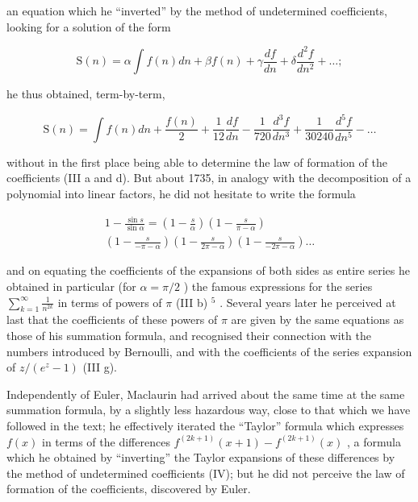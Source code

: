 an equation which he ``inverted'' by the method of undetermined coefficients, looking for a solution of the form

\[
\mathrm{S} (n) = \alpha \int f (n) d n + \beta f (n) + \gamma \frac {d f}{d n} + \delta \frac {d ^ {2} f}{d n ^ {2}} + \dots ;
\]

he thus obtained, term-by-term,

\[
\mathrm{S} (n) = \int f (n) d n + \frac {f (n)}{2} + \frac {1}{1 2} \frac {d f}{d n} - \frac {1}{7 2 0} \frac {d ^ {3} f}{d n ^ {3}} + \frac {1}{3 0 2 4 0} \frac {d ^ {5} f}{d n ^ {5}} - \dots
\]

without in the first place being able to determine the law of formation of the coefficients (III a and d). But about 1735, in analogy with the decomposition of a polynomial into linear factors, he did not hesitate to write the formula

\[
\begin{array}{c} 1 - \frac {\sin s}{\sin \alpha} = \left(1 - \frac {s}{\alpha}\right) \left(1 - \frac {s}{\pi - \alpha}\right) \\ \left(1 - \frac {s}{- \pi - \alpha}\right) \left(1 - \frac {s}{2 \pi - \alpha}\right) \left(1 - \frac {s}{- 2 \pi - \alpha}\right) \dots \end{array}
\]

and on equating the coefficients of the expansions of both sides as entire series he obtained in particular (for \(\alpha = \pi/2\) ) the famous expressions for the series \(\sum_{k=1}^{\infty} \frac{1}{n^{2k}}\) in terms of powers of \(\pi\) (III b) \(^{5}\) . Several years later he perceived at last that the coefficients of these powers of \(\pi\) are given by the same equations as those of his summation formula, and recognised their connection with the numbers introduced by Bernoulli, and with the coefficients of the series expansion of \(z/(e^{z} - 1)\) (III g).

Independently of Euler, Maclaurin had arrived about the same time at the same summation formula, by a slightly less hazardous way, close to that which we have followed in the text; he effectively iterated the ``Taylor'' formula which expresses \(f(x)\) in terms of the differences \(f^{(2k+1)}(x+1)-f^{(2k+1)}(x)\) , a formula which he obtained by ``inverting'' the Taylor expansions of these differences by the method of undetermined coefficients (IV); but he did not perceive the law of formation of the coefficients, discovered by Euler.

